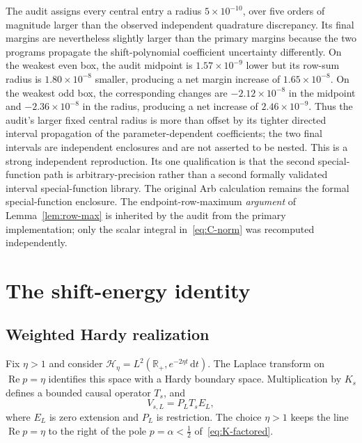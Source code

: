 \documentclass[11pt,a4paper]{article}
\newcommand{\R}{\mathbb R}
\renewcommand{\Re}{\operatorname{Re}}
\newcommand{\dd}{\,\mathrm d}
\newcommand{\Hcal}{\mathcal H}
\theoremstyle{plain}
\theoremstyle{definition}
\numberwithin{equation}{section}
\begin{document}
The audit assigns every central entry a radius $5\times10^{-10}$, over five
orders of magnitude larger than the observed independent quadrature
discrepancy. Its final margins are nevertheless slightly larger than the
primary margins because the two programs propagate the shift-polynomial
coefficient uncertainty differently. On the weakest even box, the audit
midpoint is $1.57\times10^{-9}$ lower but its row-sum radius is
$1.80\times10^{-8}$ smaller, producing a net margin increase of
$1.65\times10^{-8}$. On the weakest odd box, the corresponding changes are
$-2.12\times10^{-8}$ in the midpoint and $-2.36\times10^{-8}$ in the radius,
producing a net increase of $2.46\times10^{-9}$. Thus the audit's larger fixed
central radius is more than offset by its tighter directed interval
propagation of the parameter-dependent coefficients; the two final intervals
are independent enclosures and are not asserted to be nested. This is a strong
independent reproduction. Its one qualification is that the second
special-function path is arbitrary-precision rather than a second formally
validated interval special-function library. The original Arb calculation
remains the formal special-function enclosure. The endpoint-row-maximum
\emph{argument} of Lemma~\ref{lem:row-max} is inherited by the audit from the
primary implementation; only the scalar integral in~\eqref{eq:C-norm} was
recomputed independently.

\section{The shift-energy identity}

\subsection{Weighted Hardy realization}

Fix $\eta>1$ and consider $\Hcal_\eta=L^2(\R_+,e^{-2\eta t}\dd t)$. The Laplace
transform on $\Re p=\eta$ identifies this space with a Hardy boundary space.
Multiplication by $K_s$ defines a bounded causal operator $T_s$, and
\begin{equation}
V_{s,L}=P_LT_sE_L,
\end{equation}
where $E_L$ is zero extension and $P_L$ is restriction. The choice $\eta>1$
keeps the line $\Re p=\eta$ to the right of the pole $p=\alpha<\tfrac12$
of~\eqref{eq:K-factored}.
\end{document}
